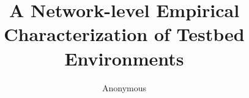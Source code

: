 \documentclass[letterpaper,twocolumn,10pt]{article}
\begin{document}
\date{}

\title{\Large \bf A Network-level Empirical Characterization of Testbed Environments}

\author{
Anonymous 
} %

\maketitle

\thispagestyle{empty}

 

 

 
 






{\footnotesize 
}
\end{document}
